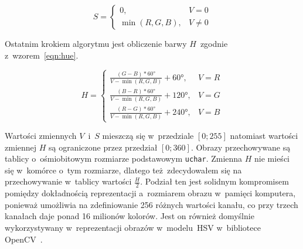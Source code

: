 \begin{equation}
    \label{eqn:saturation}
    S = \left\{ 
        \begin{array}{ll}
            0, & V = 0 \\
            \min{(R, G, B)}, & V \ne 0
        \end{array} 
        \right.
\end{equation}

Ostatnim krokiem algorytmu jest obliczenie barwy $H$~zgodnie z~wzorem~\ref{eqn:hue}.

\begin{equation}
    \label{eqn:hue}
    H = \left\{ 
        \begin{array}{ll}
            \frac{(G - B) * 60\si{\degree}}{V - \min{(R, G, B)}} + 60\si{\degree}, & V = R \\
            \frac{(B - R) * 60\si{\degree}}{V - \min{(R, G, B)}} + 120\si{\degree}, & V = G \\
            \frac{(R - G) * 60\si{\degree}}{V - \min{(R, G, B)}} + 240\si{\degree}, & V = B
        \end{array} 
        \right.
\end{equation}
\smallskip

Wartości zmiennych $V$~i~$S$ mieszczą się w~przedziale $[0; 255]$ natomiast wartości zmiennej $H$ są ograniczone przez przedział $[0; 360]$. Obrazy przechowywane są tablicy o~ośmiobitowym rozmiarze podstawowym \texttt{uchar}. Zmienna $H$ nie mieści się w~komórce o~tym rozmiarze, dlatego też zdecydowałem się na przechowywanie w~tablicy wartości $\frac{H}{2}$. Podział ten jest solidnym kompromisem pomiędzy dokładnością reprezentacji a~rozmiarem obrazu w~pamięci komputera, ponieważ umożliwia na zdefiniowanie 256 różnych wartości kanału, co przy trzech kanałach daje ponad 16 milionów kolorów. Jest on również domyślnie wykorzystywany w~reprezentacji obrazów w~modelu~HSV w~bibliotece OpenCV~\cite{opencv}.